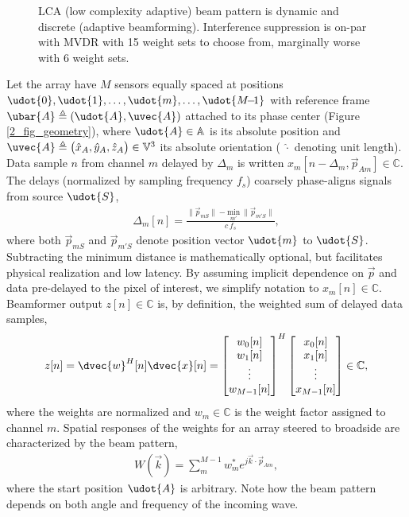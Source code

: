 {\begin{figure}[tp]
\caption{LCA (low complexity adaptive) beam pattern is dynamic and discrete (adaptive beamforming). Interference suppression is on-par with MVDR with 15 weight sets to choose from, marginally worse with 6 weight sets.}%
\label{2_fig_scenario_lca}
\end{figure}

Let the array have $M$ sensors equally spaced at positions $\udot{0},\udot{1},\dots, \udot{m}, \dots, \udot{M{\!-\!1}}$ with reference frame $\ubar{A} \triangleq (\udot{A},\uvec{A})$ attached to its phase center (Figure \ref{2_fig_geometry}), where $\udot{A}\in\mathbb{A}$ is its absolute position and $\uvec{A}\triangleq\big(\hat{x}_{A},\hat{y}_{A},\hat{z}_{A}\big)\in\mathbb{V}^3$ its absolute orientation ( $\hat{\cdot}$ denoting unit length). Data sample $n$ from channel $m$ delayed by $\Delta_m$ is written $x_m[n-\Delta_{m}, \vec{p}_{Am}]\in\mathbb{C}$. The delays (normalized by sampling frequency $f_s$) coarsely phase-aligns signals from source $\udot{S}$,
%
\begin{align}
\Delta_m[n] = \frac{\lVert \vec{p}_{mS}\rVert - \underset{m'}{\mathrm{min}}\ \lVert \vec{p}_{m'S}\rVert}{c\,f_s},\label{2_eq_delta}
\end{align}
%
where both $\vec{p}_{mS}$ and $\vec{p}_{m'S}$ denote position vector $\udot{m}$ to $\udot{S}$. Subtracting the minimum distance is mathematically optional, but facilitates physical realization and low latency. By assuming implicit dependence on $\vec{p}$ and data pre-delayed to the pixel of interest, we simplify notation to $x_m[n]\in\mathbb{C}$. Beamformer output $z[n]\in\mathbb{C}$ is, by definition, the weighted sum of delayed data samples,
%
\begin{align}
z[n] = \dvec{w}^H[n]\dvec{x}[n] = \bmat{w_0[n]\\w_1[n]\\\vdots\\w_{M-1}[n]}^H \bmat{x_0[n]\\x_1[n]\\\vdots\\x_{M-1}[n]} \in\mathbb{C},\label{2_eq_z}
\end{align}
%
where the weights are normalized and $w_m\in\mathbb{C}$ is the weight factor assigned to channel $m$. Spatial responses of the weights for an array steered to broadside are characterized by the beam pattern,
%
\begin{align}
W(\vec{k}) = \sum_m^{M-1} w_m^* e^{j\vec k \cdot \vec{p}_{Am}},\label{2_eq_beam pattern}
\end{align}
%
where the start position $\udot{A}$ is arbitrary. Note how the beam pattern depends on both angle and frequency of the incoming wave. 

}
